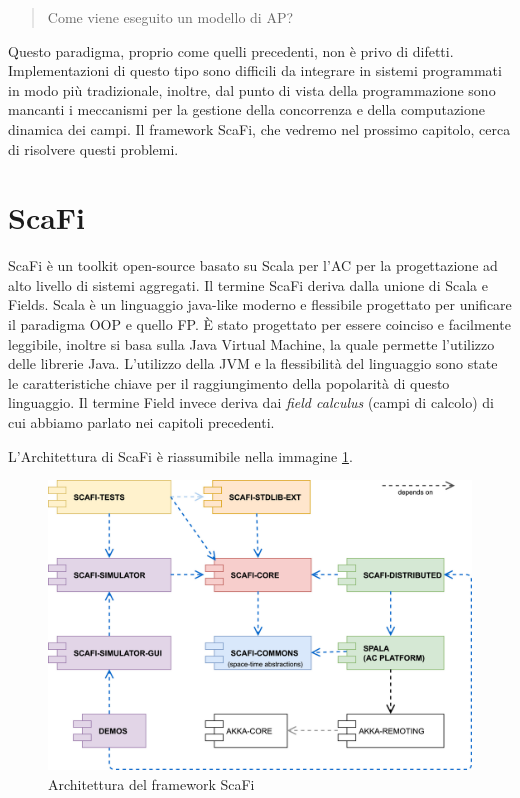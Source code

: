 \documentclass[12pt,a4paper,openright,twoside]{book}
\begin{document}
\begin{quote}
    \centering
    Come viene eseguito un modello di \ac{AP}?
\end{quote}

Questo paradigma, proprio come quelli precedenti, non è privo di difetti. 
Implementazioni di questo tipo sono difficili da integrare in sistemi programmati in modo più tradizionale, inoltre, dal punto di vista della programmazione sono mancanti i meccanismi per la gestione della concorrenza e della computazione dinamica dei campi. Il framework ScaFi, che vedremo nel prossimo capitolo, cerca di risolvere questi problemi.


\section{ScaFi}

ScaFi è un toolkit open-source basato su Scala per l'\ac{AC} per la progettazione ad alto livello di sistemi aggregati.
Il termine ScaFi deriva dalla unione di Scala e Fields. Scala è un linguaggio java-like moderno e flessibile progettato per unificare il paradigma \ac{OOP} e quello \ac{FP}. È stato progettato per essere coinciso e facilmente leggibile, inoltre si basa sulla Java Virtual Machine, la quale permette l'utilizzo delle librerie Java. L'utilizzo della JVM e la flessibilità del linguaggio sono state le caratteristiche chiave per il raggiungimento della popolarità di questo linguaggio. Il termine Field invece deriva dai \textit{field calculus} (campi di calcolo) di cui abbiamo parlato nei capitoli precedenti.

L'Architettura di ScaFi è riassumibile nella immagine \cref{fig:scafi-arc}.

\begin{figure}
    \centering
    \includegraphics[width=.8\linewidth]{figures/scafi-arc.jpg}
    \caption{Architettura del framework ScaFi}
    \label{fig:scafi-arc}
\end{figure}
\end{document}
